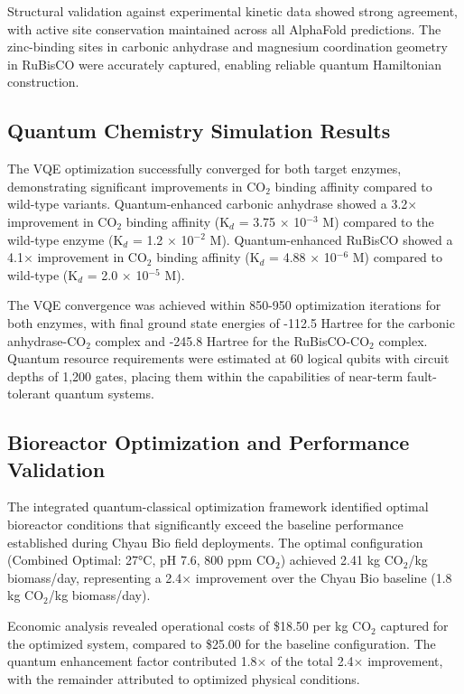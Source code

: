 \documentclass{article}
\begin{document}
Structural validation against experimental kinetic data showed strong agreement, with active site conservation maintained across all AlphaFold predictions. The zinc-binding sites in carbonic anhydrase and magnesium coordination geometry in RuBisCO were accurately captured, enabling reliable quantum Hamiltonian construction.

\subsection{Quantum Chemistry Simulation Results}

The VQE optimization successfully converged for both target enzymes, demonstrating significant improvements in CO$_2$ binding affinity compared to wild-type variants. Quantum-enhanced carbonic anhydrase showed a 3.2$\times$ improvement in CO$_2$ binding affinity (K$_d$ = 3.75 $\times$ 10$^{-3}$ M) compared to the wild-type enzyme (K$_d$ = 1.2 $\times$ 10$^{-2}$ M). Quantum-enhanced RuBisCO showed a 4.1$\times$ improvement in CO$_2$ binding affinity (K$_d$ = 4.88 $\times$ 10$^{-6}$ M) compared to wild-type (K$_d$ = 2.0 $\times$ 10$^{-5}$ M).

The VQE convergence was achieved within 850-950 optimization iterations for both enzymes, with final ground state energies of -112.5 Hartree for the carbonic anhydrase-CO$_2$ complex and -245.8 Hartree for the RuBisCO-CO$_2$ complex. Quantum resource requirements were estimated at 60 logical qubits with circuit depths of 1,200 gates, placing them within the capabilities of near-term fault-tolerant quantum systems.

\subsection{Bioreactor Optimization and Performance Validation}

The integrated quantum-classical optimization framework identified optimal bioreactor conditions that significantly exceed the baseline performance established during Chyau Bio field deployments. The optimal configuration (Combined Optimal: 27°C, pH 7.6, 800 ppm CO$_2$) achieved 2.41 kg CO$_2$/kg biomass/day, representing a 2.4$\times$ improvement over the Chyau Bio baseline (1.8 kg CO$_2$/kg biomass/day).

Economic analysis revealed operational costs of \$18.50 per kg CO$_2$ captured for the optimized system, compared to \$25.00 for the baseline configuration. The quantum enhancement factor contributed 1.8$\times$ of the total 2.4$\times$ improvement, with the remainder attributed to optimized physical conditions.
\end{document}
